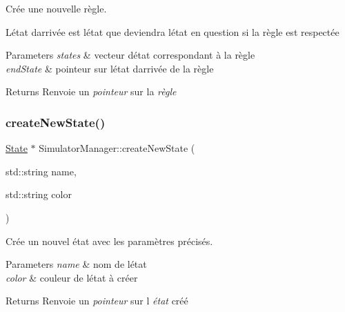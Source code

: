 Crée une nouvelle règle. 

L\textquotesingle{}état d\textquotesingle{}arrivée est l\textquotesingle{}état que deviendra l\textquotesingle{}état en question si la règle est respectée 
\begin{DoxyParams}{Parameters}
{\em states} & vecteur d\textquotesingle{}état correspondant à la règle \\
\hline
{\em end\+State} & pointeur sur l\textquotesingle{}état d\textquotesingle{}arrivée de la règle \\
\hline
\end{DoxyParams}
\begin{DoxyReturn}{Returns}
Renvoie un {\itshape pointeur} sur la {\itshape règle} 
\end{DoxyReturn}
\mbox{\label{class_simulator_manager_a2f8bcdd270d9796aa9c5ba7ddc9c9ab8}} 
\subsubsection{\texorpdfstring{create\+New\+State()}{createNewState()}}
{\footnotesize\ttfamily \mbox{\hyperlink{class_state}{State}} $\ast$ Simulator\+Manager\+::create\+New\+State (\begin{DoxyParamCaption}\item[{std\+::string}]{name,  }\item[{std\+::string}]{color }\end{DoxyParamCaption})}



Crée un nouvel état avec les paramètres précisés. 


\begin{DoxyParams}{Parameters}
{\em name} & nom de l\textquotesingle{}état \\
\hline
{\em color} & couleur de l\textquotesingle{}état à créer \\
\hline
\end{DoxyParams}
\begin{DoxyReturn}{Returns}
Renvoie un {\itshape pointeur} sur l\textquotesingle{} {\itshape état} créé 
\end{DoxyReturn}
\mbox{\label{class_simulator_manager_af713a5605970b710c2526e7f6ee51a89}} 
